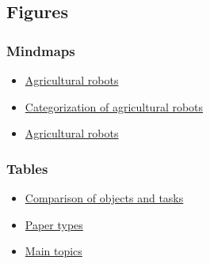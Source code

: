     \subsection{Figures}

    \subsubsection{Mindmaps}
    \begin{itemize}
        \item \hyperlink{fig:mindmap_agribots}{Agricultural robots}
        \item \hyperlink{fig:category_mindmap}{Categorization of agricultural robots}
        \item \hyperlink{fig:mindmap_agribots}{Agricultural robots}
    \end{itemize}
    \subsubsection{Tables}
    \begin{itemize}
        \item \hyperref[table:objects_and_tasks]{Comparison of objects and tasks}
        \item \hyperref[table:paper_types]{Paper types}
        \item \hyperref[table:main_topics]{Main topics}
    \end{itemize}

